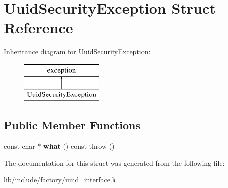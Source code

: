 \hypertarget{structUuidSecurityException}{\section{Uuid\-Security\-Exception Struct Reference}
\label{structUuidSecurityException}
}
Inheritance diagram for Uuid\-Security\-Exception\-:\begin{figure}[H]
\begin{center}
\leavevmode
\includegraphics[height=2.000000cm]{structUuidSecurityException}
\end{center}
\end{figure}
\subsection*{Public Member Functions}
\begin{DoxyCompactItemize}
\item 
\hypertarget{structUuidSecurityException_a1948c80e24e011b4b90ab53dae0ecf37}{const char $\ast$ {\bfseries what} () const   throw ()}\label{structUuidSecurityException_a1948c80e24e011b4b90ab53dae0ecf37}

\end{DoxyCompactItemize}


The documentation for this struct was generated from the following file\-:\begin{DoxyCompactItemize}
\item 
lib/include/factory/uuid\-\_\-interface.\-h\end{DoxyCompactItemize}
